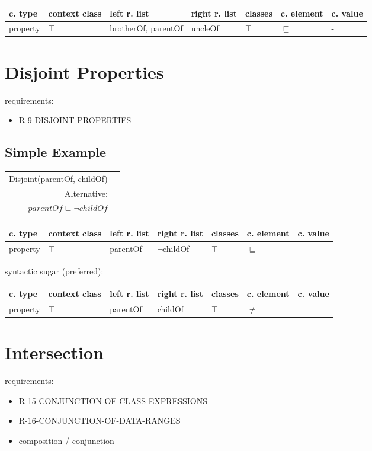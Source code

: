 \documentclass{llncs}
\newenvironment{gcotable}{
  \scriptsize
  \sffamily
  \vspace{0.3cm}
	\begin{center}
  \begin{tabular}{l|l|l|l|l|l|l}
  \hline
  \textbf{c. type} & \textbf{context class} & \textbf{left r. list} & \textbf{right r. list} & \textbf{classes} & \textbf{c. element} & \textbf{c. value} \\
  \hline

}{
  \hline
  \end{tabular}
	\end{center}
}
\newenvironment{DL}{
	\begin{center}
  \begin{tabular}{r l}

}{
  \end{tabular}
	\end{center}
}
\begin{document}
\begin{gcotable}
property & $\top$ & brotherOf, parentOf & uncleOf & $\top$ & $\sqsubseteq$ & -  \\
\end{gcotable}

\section{Disjoint Properties}

requirements:

\begin{itemize}
	\item R-9-DISJOINT-PROPERTIES
\end{itemize}

\subsection{Simple Example}

\begin{DL}
Disjoint(parentOf, childOf)\\
Alternative:\\
$parentOf \sqsubseteq \neg childOf$
\end{DL}

\begin{gcotable}
property & $\top$ & parentOf & $\neg$childOf & $\top$ & $\sqsubseteq$ \\
\end{gcotable}

syntactic sugar (preferred):

\begin{gcotable}
property & $\top$ & parentOf & childOf & $\top$ & $\ne$ \\
\end{gcotable}

\section{Intersection}

requirements:

\begin{itemize}
  \item R-15-CONJUNCTION-OF-CLASS-EXPRESSIONS
	\item R-16-CONJUNCTION-OF-DATA-RANGES
\end{itemize}



\begin{itemize}
	\item composition / conjunction
\end{itemize}
\end{document}
